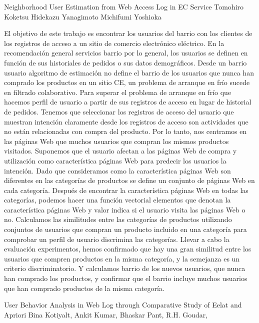 Neighborhood User Estimation from Web Access Log in EC Service
Tomohiro Koketsu
Hidekazu Yanagimoto
Michifumi Yoshioka

El objetivo de este trabajo es encontrar los usuarios del barrio con los clientes de los registros de acceso a un sitio de comercio electrónico eléctrico. En la recomendación general servicios barrio por lo general, los usuarios se definen en función de sus historiales de pedidos o sus datos demográficos. Desde un barrio usuario algoritmo de estimación no define el barrio de los usuarios que nunca han comprado los productos en un sitio CE, un problema de arranque en frío sucede en filtrado colaborativo. Para superar el problema de arranque en frío que hacemos perfil de usuario a partir de sus registros de acceso en lugar de historial de pedidos. Tenemos que seleccionar los registros de acceso del usuario que muestran intención claramente desde los registros de acceso son actividades que no están relacionadas con compra del producto. Por lo tanto, nos centramos en las páginas Web que muchos usuarios que compran los mismos productos visitados. Suponemos que el usuario afectan a las páginas Web de compra y utilización como característica páginas Web para predecir los usuarios la intención. Dado que consideramos como la característica páginas Web son diferentes en las categorías de productos se define un conjunto de páginas Web en cada categoría. Después de encontrar la característica páginas Web en todas las categorías, podemos hacer una función vectorial elementos que denotan la característica páginas Web y valor indica si el usuario visita las páginas Web o no. Calculamos las similitudes entre las categorías de productos utilizando conjuntos de usuarios que compran un producto incluido en una categoría para comprobar un perfil de usuario discrimina las categorías. Llevar a cabo la evaluación experimentos, hemos confirmado que hay una gran similitud entre los usuarios que compren productos en la misma categoría, y la semejanza es un criterio discriminatorio. Y calculamos barrio de los nuevos usuarios, que nunca han comprado los productos, y confirmar que el barrio incluye muchos usuarios que han comprado productos de la misma categoría.



User Behavior Analysis in Web Log through Comparative Study of Eelat and Apriori
Bina Kotiyalt, Ankit Kumar, Bhaskar Pant, R.H. Goudar,

